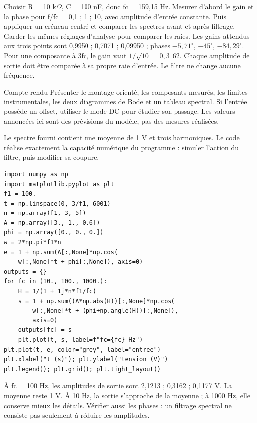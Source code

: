 Choisir R = 10 k$\Omega$, C = 100 nF, donc fc = 159,15 Hz. Mesurer d’abord le gain et la phase pour f/fc = 0,1 ; 1 ; 10, avec amplitude d’entrée constante. Puis appliquer un créneau centré et comparer les spectres avant et après filtrage. Garder les mêmes réglages d’analyse pour comparer les raies.
Les gains attendus aux trois points sont 0,9950 ; 0,7071 ; 0,09950 ; phases $-5{,}71^\circ$, $-45^\circ$, $-84{,}29^\circ$. Pour une composante à 3fc, le gain vaut $1/\sqrt{10}=0{,}3162$. Chaque amplitude de sortie doit être comparée à sa propre raie d’entrée. Le filtre ne change aucune fréquence.
\begin{docu}{Compte rendu}
Présenter le montage orienté, les composants mesurés, les limites instrumentales, les deux diagrammes de Bode et un tableau spectral. Si l’entrée possède un offset, utiliser le mode DC pour étudier son passage. Les valeurs annoncées ici sont des prévisions du modèle, pas des mesures réalisées.
\end{docu}


Le spectre fourni contient une moyenne de 1 V et trois harmoniques. Le code réalise exactement la capacité numérique du programme : simuler l’action du filtre, puis modifier sa coupure.
\begin{verbatim}
import numpy as np
import matplotlib.pyplot as plt
f1 = 100.
t = np.linspace(0, 3/f1, 6001)
n = np.array([1, 3, 5])
A = np.array([3., 1., 0.6])
phi = np.array([0., 0., 0.])
w = 2*np.pi*f1*n
e = 1 + np.sum(A[:,None]*np.cos(
    w[:,None]*t + phi[:,None]), axis=0)
outputs = {}
for fc in (10., 100., 1000.):
    H = 1/(1 + 1j*n*f1/fc)
    s = 1 + np.sum((A*np.abs(H))[:,None]*np.cos(
        w[:,None]*t + (phi+np.angle(H))[:,None]),
        axis=0)
    outputs[fc] = s
    plt.plot(t, s, label=f"fc={fc} Hz")
plt.plot(t, e, color="grey", label="entree")
plt.xlabel("t (s)"); plt.ylabel("tension (V)")
plt.legend(); plt.grid(); plt.tight_layout()
\end{verbatim}
À fc = 100 Hz, les amplitudes de sortie sont 2,1213 ; 0,3162 ; 0,1177 V. La moyenne reste 1 V. À 10 Hz, la sortie s’approche de la moyenne ; à 1000 Hz, elle conserve mieux les détails. Vérifier aussi les phases : un filtrage spectral ne consiste pas seulement à réduire les amplitudes.



